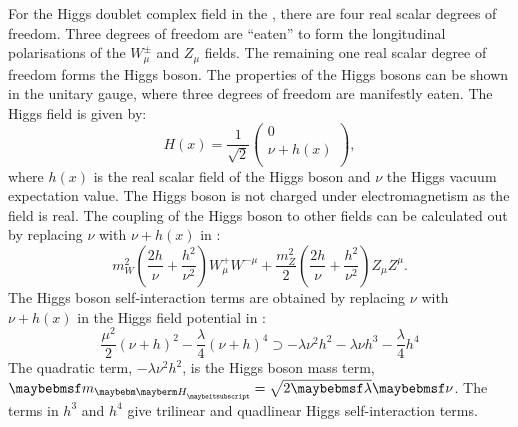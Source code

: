 
For the Higgs doublet complex field in the \SM, there are four real scalar degrees of freedom. Three degrees of freedom are ``eaten'' to form the longitudinal polarisations of the $W^{\pm}_\mu$ and $Z_\mu$ fields. The remaining one real scalar degree of freedom forms the Higgs boson. The properties of the Higgs bosons can be shown in the unitary gauge, where three degrees of freedom are manifestly eaten. The Higgs field is given by:
\begin{equation}
H(x) = \frac{1}{\sqrt{2}}
 \begin{pmatrix}
  0 \\
  \nu + h(x) \\
 \end{pmatrix},
\end{equation}
where $h(x)$ is the real scalar field of the Higgs boson and $\nu$ the Higgs vacuum expectation value. The Higgs boson is not charged under electromagnetism as the field is real. The coupling of the Higgs boson to other fields  can be calculated out by replacing $\nu$  with $\nu + h(x)$ in :
\begin{equation}
m^2_W\left(\frac{2h}{\nu} + \frac{{h}^2}{\nu^2}\right)W^+_{\mu}W^{-\mu} + \frac{m^2_Z}{2}\left(\frac{2h}{\nu} + \frac{{h}^2}{\nu^2}  \right)Z_{\mu}Z^{\mu}.
\label{eq:theoryHiggsBosonic}
\end{equation}
The Higgs boson self-interaction terms are obtained  by replacing $\nu$  with $\nu + h(x)$  in the Higgs field potential in :
\begin{equation}
\frac{\mu^2}{2}\left(\nu+h\right)^2 - \frac{\lambda}{4}\left(\nu+h\right)^4 \supset -\lambda\nu^2{h}^2-\lambda\nu{h}^3 - \frac{\lambda}{4}h^4 %
\label{eq:theoryHiggsSelfCoupling}
\end{equation}
The quadratic term, $-\lambda\nu^2{h}^2$, is the Higgs boson mass term, $\Hmass=\sqrt{2\lambda}\nu$. The terms in $h^3$ and $h^4$ give trilinear and quadlinear Higgs self-interaction terms.

